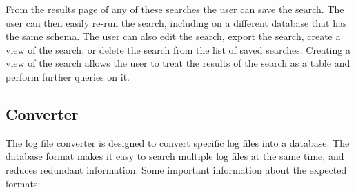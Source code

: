 \documentclass[letterpaper,11pt,twoside,final]{article}
\begin{document}
From the results page of any of these searches the user can save the
search. The user can then easily re-run the search, including on a
different database that has the same schema. The user can also edit
the search, export the search, create a view of the search, or delete
the search from the list of saved searches. Creating a view of the
search allows the user to treat the results of the search as a table
and perform further queries on it.

\subsection*{Converter}
The log file converter is designed to convert specific log files into a database. The database format makes it easy to search
multiple log files at the same time, and reduces redundant
information. Some important information about the expected formats:
\end{document}
